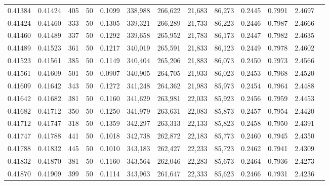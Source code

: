 \begin{tabular}{rrrrrrrrrrrrr}
0.41384 & 0.41424 &   405 &  50 &                                     0.1099 & 338,988 & 266,622 &  21,683 &  86,273 & 0.2445 & 0.7991 & 2.4697 \\
0.41424 & 0.41460 &   333 &  50 &                                     0.1305 & 339,321 & 266,289 &  21,733 &  86,223 & 0.2446 & 0.7987 & 2.4666 \\
0.41460 & 0.41489 &   337 &  50 &                                     0.1292 & 339,658 & 265,952 &  21,783 &  86,173 & 0.2447 & 0.7982 & 2.4635 \\
0.41489 & 0.41523 &   361 &  50 &                                     0.1217 & 340,019 & 265,591 &  21,833 &  86,123 & 0.2449 & 0.7978 & 2.4602 \\
0.41523 & 0.41561 &   385 &  50 &                                     0.1149 & 340,404 & 265,206 &  21,883 &  86,073 & 0.2450 & 0.7973 & 2.4566 \\
0.41561 & 0.41609 &   501 &  50 &                                     0.0907 & 340,905 & 264,705 &  21,933 &  86,023 & 0.2453 & 0.7968 & 2.4520 \\
0.41609 & 0.41642 &   343 &  50 &                                     0.1272 & 341,248 & 264,362 &  21,983 &  85,973 & 0.2454 & 0.7964 & 2.4488 \\
0.41642 & 0.41682 &   381 &  50 &                                     0.1160 & 341,629 & 263,981 &  22,033 &  85,923 & 0.2456 & 0.7959 & 2.4453 \\
0.41682 & 0.41712 &   350 &  50 &                                     0.1250 & 341,979 & 263,631 &  22,083 &  85,873 & 0.2457 & 0.7954 & 2.4420 \\
0.41712 & 0.41747 &   318 &  50 &                                     0.1359 & 342,297 & 263,313 &  22,133 &  85,823 & 0.2458 & 0.7950 & 2.4391 \\
0.41747 & 0.41788 &   441 &  50 &                                     0.1018 & 342,738 & 262,872 &  22,183 &  85,773 & 0.2460 & 0.7945 & 2.4350 \\
0.41788 & 0.41832 &   445 &  50 &                                     0.1010 & 343,183 & 262,427 &  22,233 &  85,723 & 0.2462 & 0.7941 & 2.4309 \\
0.41832 & 0.41870 &   381 &  50 &                                     0.1160 & 343,564 & 262,046 &  22,283 &  85,673 & 0.2464 & 0.7936 & 2.4273 \\
0.41870 & 0.41909 &   399 &  50 &                                     0.1114 & 343,963 & 261,647 &  22,333 &  85,623 & 0.2466 & 0.7931 & 2.4236 \\

\end{tabular}
